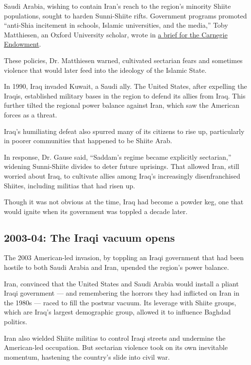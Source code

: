 Saudi Arabia, wishing to contain Iran's reach to the region's minority
Shiite populations, sought to harden Sunni-Shiite rifts. Government
programs promoted ``anti-Shia incitement in schools, Islamic
universities, and the media,'' Toby Matthiesen, an Oxford University
scholar, wrote in \href{http://carnegieendowment.org/sada/?fa=60799}{a
brief for the Carnegie Endowment}.

These policies, Dr. Matthiesen warned, cultivated sectarian fears and
sometimes violence that would later feed into the ideology of the
Islamic State.

In 1990, Iraq invaded Kuwait, a Saudi ally. The United States, after
expelling the Iraqis, established military bases in the region to defend
its allies from Iraq. This further tilted the regional power balance
against Iran, which saw the American forces as a threat.

Iraq's humiliating defeat also spurred many of its citizens to rise up,
particularly in poorer communities that happened to be Shiite Arab.

In response, Dr. Gause said, ``Saddam's regime became explicitly
sectarian,'' widening Sunni-Shiite divides to deter future uprisings.
That allowed Iran, still worried about Iraq, to cultivate allies among
Iraq's increasingly disenfranchised Shiites, including militias that had
risen up.

Though it was not obvious at the time, Iraq had become a powder keg, one
that would ignite when its government was toppled a decade later.

\hypertarget{2003-04-the-iraqi-vacuum-opens}{%
\subsection{2003-04: The Iraqi vacuum
opens}\label{2003-04-the-iraqi-vacuum-opens}}

The 2003 American-led invasion, by toppling an Iraqi government that had
been hostile to both Saudi Arabia and Iran, upended the region's power
balance.

Iran, convinced that the United States and Saudi Arabia would install a
pliant Iraqi government --- and remembering the horrors they had
inflicted on Iran in the 1980s --- raced to fill the postwar vacuum. Its
leverage with Shiite groups, which are Iraq's largest demographic group,
allowed it to influence Baghdad politics.

Iran also wielded Shiite militias to control Iraqi streets and undermine
the American-led occupation. But sectarian violence took on its own
inevitable momentum, hastening the country's slide into civil war.

